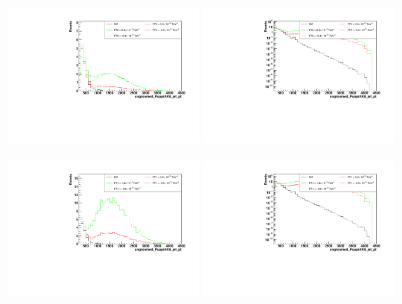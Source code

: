 \begin{figure}[h]
  \begin{center}
	\includegraphics[width=0.45\textwidth]{Plots/aQGC_kinematics/ungroomed_PuppiAK8_jet_pt_FT0.pdf}%
	\includegraphics[width=0.45\textwidth]{Plots/aQGC_kinematics/ungroomed_PuppiAK8_jet_pt_FT0_log.pdf}\\
    \caption{}
  \end{center}
\end{figure}
\begin{figure}[h]
  \begin{center}
	\includegraphics[width=0.45\textwidth]{Plots/aQGC_kinematics/ungroomed_PuppiAK8_jet_pt_FT1.pdf}%
	\includegraphics[width=0.45\textwidth]{Plots/aQGC_kinematics/ungroomed_PuppiAK8_jet_pt_FT1_log.pdf}\\
    \caption{}
  \end{center}
\end{figure}
